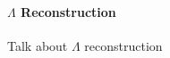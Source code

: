 \paragraph{$\Lambda$ Reconstruction}
\label{LambdaReconstruction}

Talk about $\Lambda$ reconstruction